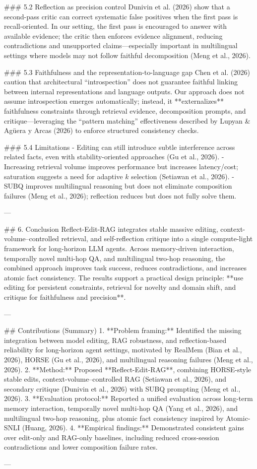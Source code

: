 ### 5.2 Reflection as precision control  
Dunivin et al. (2026) show that a second-pass critic can correct systematic false positives when the first pass is recall-oriented. In our setting, the first pass is encouraged to answer with available evidence; the critic then enforces evidence alignment, reducing contradictions and unsupported claims—especially important in multilingual settings where models may not follow faithful decomposition (Meng et al., 2026).

### 5.3 Faithfulness and the representation-to-language gap  
Chen et al. (2026) caution that architectural “introspection” does not guarantee faithful linking between internal representations and language outputs. Our approach does not assume introspection emerges automatically; instead, it **externalizes** faithfulness constraints through retrieval evidence, decomposition prompts, and critique—leveraging the “pattern matching” effectiveness described by Lupyan & Agüera y Arcas (2026) to enforce structured consistency checks.

### 5.4 Limitations  
- Editing can still introduce subtle interference across related facts, even with stability-oriented approaches (Gu et al., 2026).  
- Increasing retrieval volume improves performance but increases latency/cost; saturation suggests a need for adaptive \(k\) selection (Setiawan et al., 2026).  
- SUBQ improves multilingual reasoning but does not eliminate composition failures (Meng et al., 2026); reflection reduces but does not fully solve them.

---

## 6. Conclusion  
Reflect-Edit-RAG integrates stable massive editing, context-volume–controlled retrieval, and self-reflection critique into a single compute-light framework for long-horizon LLM agents. Across memory-driven interaction, temporally novel multi-hop QA, and multilingual two-hop reasoning, the combined approach improves task success, reduces contradictions, and increases atomic fact consistency. The results support a practical design principle: **use editing for persistent constraints, retrieval for novelty and domain shift, and critique for faithfulness and precision**.

---

## Contributions (Summary)  
1. **Problem framing:** Identified the missing integration between model editing, RAG robustness, and reflection-based reliability for long-horizon agent settings, motivated by RealMem (Bian et al., 2026), HORSE (Gu et al., 2026), and multilingual reasoning failures (Meng et al., 2026).  
2. **Method:** Proposed **Reflect-Edit-RAG**, combining HORSE-style stable edits, context-volume–controlled RAG (Setiawan et al., 2026), and secondary critique (Dunivin et al., 2026) with SUBQ prompting (Meng et al., 2026).  
3. **Evaluation protocol:** Reported a unified evaluation across long-term memory interaction, temporally novel multi-hop QA (Yang et al., 2026), and multilingual two-hop reasoning, plus atomic fact consistency inspired by Atomic-SNLI (Huang, 2026).  
4. **Empirical findings:** Demonstrated consistent gains over edit-only and RAG-only baselines, including reduced cross-session contradictions and lower composition failure rates.

---